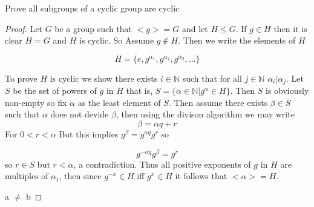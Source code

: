 \documentclass[11pt,largemargins]{homework}
\newcommand{\N}{\mathbb{N}}
\begin{document}
\maketitle

\question
Prove all subgroups of a cyclic group are cyclic 

\begin{proof}
Let $G$ be a group such that $<g> = G$ and let $H \leq G$. If $g \in H$ then it is clear $H = G$ and $H$ is cyclic. So 
Assume $g \notin H$. Then we write the elements of $H$ 

\[H = \{e, g^{\alpha_1}, g^{\alpha_2}, g^{\alpha_3}, ... \} \] 

To prove $H$ is cyclic we show there exists $i \in \N$ such that for all $j \in \N$ 
$\alpha_i | \alpha_j$. Let $S$ be the set of powers of $g$ in $H$ that is, $S = \{\alpha \in \N | g^\alpha \in H \}$. Then 
$S$ is obviously non-empty so fix $\alpha$ as the least element of $S$. Then assume there exists $\beta \in S$ such that $\alpha$ does not 
devide $\beta$, then using the divison algorithm we may write 
\[ \beta = \alpha q + r  \] 
For $0 < r < \alpha $ But this implies $g^{\beta} = g^{\alpha q}g^{r}$ so 

\[g^{-\alpha q}g^{\beta} = g^r \] 
so $r \in S$ but $r < \alpha $, a contradiction. Thus all positive exponents of $g$ in $H$ are multiples of $\alpha_i$, then since $g^{-x} \in H$ 
iff $g^x \in H$ it follows that $<\alpha> = H$. 

a $\neq$ b
    
\end{proof}

\end{document}
